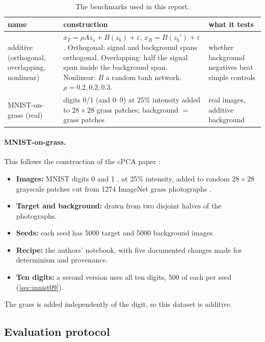 \documentclass[10pt]{article}
\begin{document}
\begin{table}[htbp]
\centering
\small
\caption{The benchmarks used in this report.}
\label{tab:benchmarks}
\begin{tabular}{p{3.3cm}p{6.6cm}p{5.2cm}}
  \toprule
  name & construction & what it tests \\
  \midrule
  additive (orthogonal, overlapping, nonlinear) & $x_T = \rho A z_s + B(z_b) + \varepsilon$, $x_B = B(z_b') + \varepsilon$. Orthogonal: signal and background spans orthogonal. Overlapping: half the signal span inside the background span. Nonlinear: $B$ a random tanh network. $\rho = 0.2, 0.2, 0.3$. & whether background negatives beat simple controls \\
  MNIST-on-grass (real) & digits 0/1 (and 0--9) at 25\% intensity added to $28\times28$ grass patches; background $=$ grass patches & real images, additive background \\
  \bottomrule
\end{tabular}
\end{table}

\paragraph{MNIST-on-grass.} This follows the construction of the cPCA paper \cite{abid2018cpca}:
\begin{itemize}
  \item \textbf{Images:} MNIST digits 0 and 1 \cite{lecun1998mnist}, at 25\% intensity, added to random $28\times 28$ grayscale patches cut from 1274 ImageNet grass photographs \cite{deng2009imagenet}.
  \item \textbf{Target and background:} drawn from two disjoint halves of the photographs.
  \item \textbf{Seeds:} each seed has 5000 target and 5000 background images.
  \item \textbf{Recipe:} the authors' notebook, with five documented changes made for determinism and provenance.
  \item \textbf{Ten digits:} a second version uses all ten digits, 500 of each per seed (\cref{sec:mnist09}).
\end{itemize}
The grass is added independently of the digit, so this dataset is additive.

\subsection{Evaluation protocol}
\label{sec:protocol}
\end{document}
